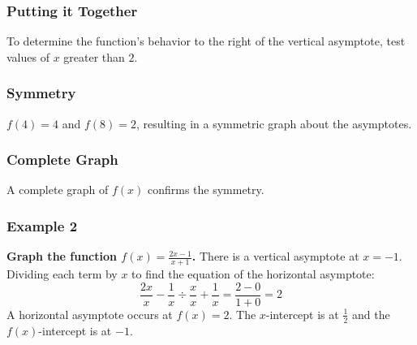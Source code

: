 \documentclass{article}
\begin{document}
\begin{center}
\end{center}

\subsubsection{Putting it Together}
To determine the function's behavior to the right of the vertical asymptote, test values of $x$ greater than $2$.

\subsubsection{Symmetry}
$f(4) = 4$ and $f(8) = 2$, resulting in a symmetric graph about the asymptotes.

\subsubsection{Complete Graph}
A complete graph of $f(x)$ confirms the symmetry.

\subsubsection*{Example 2}
\textbf{Graph the function $f(x) = \frac{2x - 1}{x + 1}$.} There is a vertical asymptote at $x = -1$. Dividing each term by $x$ to find the equation of the horizontal asymptote:
\[
\frac{2x}{x} - \frac{1}{x} \div \frac{x}{x} + \frac{1}{x} = \frac{2 - 0}{1 + 0} = 2
\]
A horizontal asymptote occurs at $f(x) = 2$. The $x$-intercept is at $\frac{1}{2}$ and the $f(x)$-intercept is at $-1$.
\end{document}
